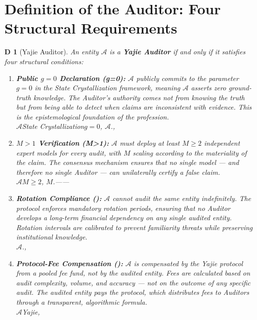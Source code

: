 \documentclass[12pt,a4paper]{article}
\newtheorem{definition}[theorem]Definition
\theoremstyle{remark}
\begin{document}
\section{Definition of the Auditor: Four Structural Requirements}
\begin{definition}[Yajie Auditor]
An entity $\mathcal{A}$ is a \textbf{Yajie Auditor} if and only if it satisfies four 
structural conditions:
\begin{enumerate}[label=(\textbf{R\arabic*}), leftmargin=*]
 \item \textbf{Public $g=0$ Declaration (g=0):} $\mathcal{A}$ publicly 
 commits to the parameter $g=0$ in the State Crystallization framework, 
 meaning $\mathcal{A}$ asserts zero ground-truth knowledge. The Auditor's 
 authority comes not from knowing the truth but from being able to detect 
 when claims are inconsistent with evidence. This is the epistemological 
 foundation of the profession.
 \\ \small $\mathcal{A}$State Crystallization$g=0$, 
 $\mathcal{A}$., 
 \item \textbf{$M>1$ Verification (M>1):} $\mathcal{A}$ must deploy at least 
 $M \geq 2$ independent expert models for every audit, with $M$ scaling 
 according to the materiality of the claim. The consensus mechanism ensures 
 that no single model --- and therefore no single Auditor --- can unilaterally 
 certify a false claim.
 \\ \small $\mathcal{A}$$M \geq 2$, 
 $M$.------
 \item \textbf{Rotation Compliance ():} $\mathcal{A}$ cannot audit the same 
 entity indefinitely. The protocol enforces mandatory rotation periods, ensuring 
 that no Auditor develops a long-term financial dependency on any single audited 
 entity. Rotation intervals are calibrated to prevent familiarity threats while 
 preserving institutional knowledge.
 \\ \small $\mathcal{A}$., 
 \item \textbf{Protocol-Fee Compensation ():} $\mathcal{A}$ is compensated 
 by the Yajie protocol from a pooled fee fund, not by the audited entity. Fees 
 are calculated based on audit complexity, volume, and accuracy --- not on the 
 outcome of any specific audit. The audited entity pays the protocol, which 
 distributes fees to Auditors through a transparent, algorithmic formula.
 \\ \small $\mathcal{A}$Yajie, 
\end{enumerate}
\end{definition}
\end{document}
